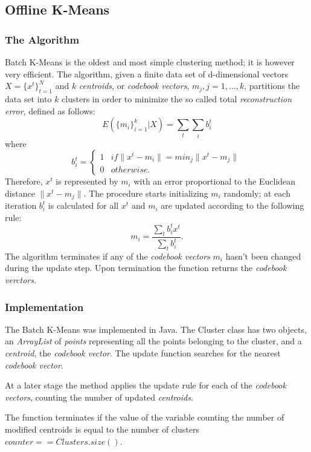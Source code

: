 \documentclass{lmproj}
\begin{document}
\subsection{Offline K-Means}
\subsubsection{The Algorithm}
Batch K-Means is the oldest and most simple clustering method; it is however very efficient. The algorithm, given a finite data set of d-dimensional vectors $X=\{x^t\}_{t=1}^{N}$ and $k$ \textit{centroids}, or \textit{codebook vectors}, $m_j,j=1,...,k$, partitions the data set into $k$ clusters in order to minimize the so called total \textit{reconstruction error}, defined as follows:
\begin{equation}
E(\{m_i\}^k_{i=1}|X)=\underset{t}{\sum}\underset{i}{\sum}b_i^t
\end{equation}
where
\begin{equation}
b_i^t=
\begin{cases}
1 & if \parallel x^t -m_i \parallel = min_j \parallel x^t - m_j \parallel \\
0 & otherwise.
\end{cases}
\end{equation}
Therefore, $x^t$ is represented by $m_i$ with an error proportional to the Euclidean distance $\parallel x^t - m_j \parallel$. The procedure starts initializing $m_i$ randomly; at each iteration $b_i^t$ is calculated for all $x^t$ and $m_i$ are updated according to the following rule:
\begin{equation}
m_i=\dfrac{\sum_t b_i^t x^t}{\sum_t b_i^t}.
\end{equation}
The algorithm terminates if any of the \textit{codebook vectors} $m_i$ hasn't been changed during the update step. Upon termination the function returns the \textit{codebook verctors}\cite{Clustering}.

\subsubsection{Implementation}
The Batch K-Means was implemented in Java. The Cluster class has two objects, an \textit{ArrayList} of \textit{points} representing all the points belonging to the cluster, and a \textit{centroid}, the \textit{codebook vector}.
The update function searches for the nearest \textit{codebook vector}.

At a later stage the method applies the update rule for each of the \textit{codebook vectors}, counting the number of updated \textit{centroids}.

The function terminates if the value of the variable counting the number of modified centroids is equal to the number of clusters $counter == Clusters.size()$.
\end{document}
